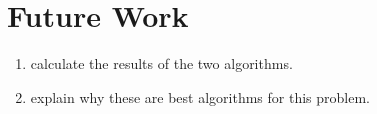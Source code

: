 










\section{Future Work}
\begin{enumerate}
    \item calculate the results of the two algorithms.
    \item explain why these are best algorithms for this problem. 
\end{enumerate}

